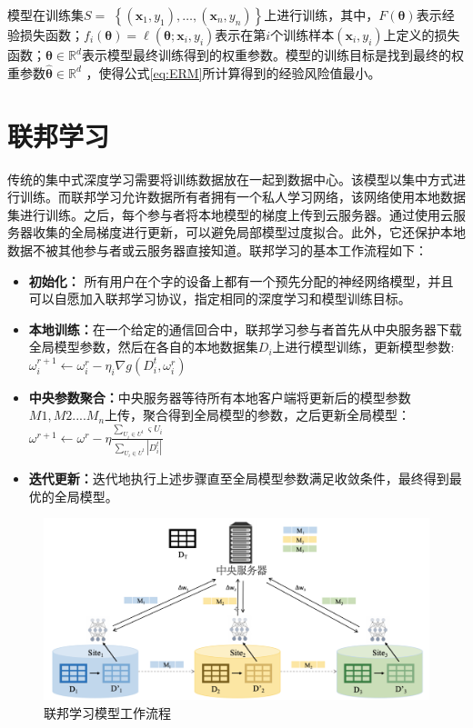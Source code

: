 模型在训练集$S=$ $\left\{\left(\mathbf{x}_{1}, y_{1}\right), \ldots,\left(\mathbf{x}_{n}, y_{n}\right)\right\}$上进行训练，其中，$F(\boldsymbol{\theta})$表示经验损失函数；$f_{i}(\boldsymbol{\theta})=\ell\left(\boldsymbol{\theta} ; \mathbf{x}_{i}, y_{i}\right)$表示在第$i$个训练样本$\left(\mathbf{x}_{i}, y_{i}\right)$上定义的损失函数；$\boldsymbol{\theta} \in \mathbb{R}^{d}$表示模型最终训练得到的权重参数。模型的训练目标是找到最终的权重参数$\widehat{\boldsymbol{\theta}} \in \mathbb{R}^{d}$ ，使得公式\ref{eq:ERM}所计算得到的经验风险值最小。

\section{联邦学习}
传统的集中式深度学习需要将训练数据放在一起到数据中心。该模型以集中方式进行训练。而联邦学习允许数据所有者拥有一个私人学习网络，该网络使用本地数据集进行训练。之后，每个参与者将本地模型的梯度上传到云服务器。通过使用云服务器收集的全局梯度进行更新，可以避免局部模型过度拟合。此外，它还保护本地数据不被其他参与者或云服务器直接知道。联邦学习的基本工作流程如下：
\begin{itemize}
\item \textbf{初始化：}
所有用户在个字的设备上都有一个预先分配的神经网络模型，并且可以自愿加入联邦学习协议，指定相同的深度学习和模型训练目标。
\item  \textbf{本地训练：}在一个给定的通信回合中，联邦学习参与者首先从中央服务器下载全局模型参数，然后在各自的本地数据集$D_{i}$上进行模型训练，更新模型参数:$\omega_{i}^{r+1} \leftarrow \omega_{i}^{r}-\eta_{i} \nabla g\left(D_{i}^{t}, \omega_{i}^{r}\right)$
\item \textbf{中央参数聚合：}中央服务器等待所有本地客户端将更新后的模型参数$M1,M2....M_{n}$上传，聚合得到全局模型的参数，之后更新全局模型：$\omega^{r+1} \leftarrow \omega^{r}-\eta \frac{\sum_{U_{i} \in U^{t}} \varsigma U_{i}}{\sum_{U_{i} \in U^{t}}\left|D_{i}^{t}\right|}$
\item \textbf{迭代更新：}迭代地执行上述步骤直至全局模型参数满足收敛条件，最终得到最优的全局模型。
\end{itemize}

\begin{figure}[!hbt]
\centering
	\includegraphics[scale=0.45]{fig2/C2/联邦学习模型流程}%
	\caption{联邦学习模型工作流程}
	\label{fig:联邦学习模型工作流程}	
\end{figure}

